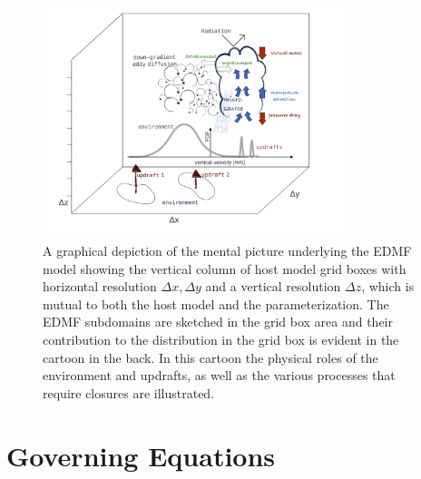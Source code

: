 \documentclass{report}
\begin{document}
\begin{figure}[htb]
\noindent\includegraphics[width=0.8\textwidth]{CLIMA-parameterization/figures/sketch_design_docs.jpg}
\caption{A graphical depiction of the mental picture underlying the EDMF model showing the vertical column of host model grid boxes with horizontal resolution $\Delta x, \Delta y$ and a vertical resolution $\Delta z$, which is mutual to both the host model and the parameterization. The EDMF subdomains are sketched in the grid box area and their contribution to the distribution in the grid box is evident in the cartoon in the back. In this cartoon the physical roles of the environment and updrafts, as well as the various processes that require closures are illustrated.}
\label{fig:EDMF sketch}
\end{figure}


\section{Governing Equations} \label{sec:Governing Equations} 
\end{document}
